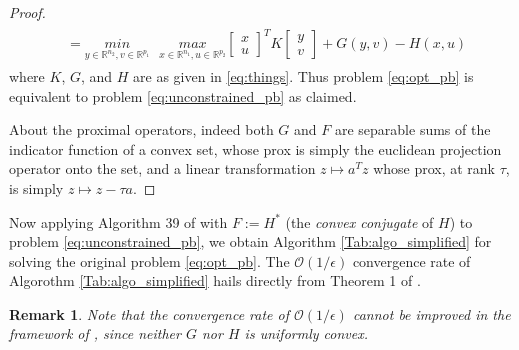\documentclass{article} %
\newtheorem{remark}{Remark}
\begin{document}
\begin{proof}
\begin{eqnarray*}
\begin{split}
      &=     \underset{y \in \mathbb{R}^{n_2}, v\in \mathbb{R}^{p_1}}{min}\text{ }\underset{x \in \mathbb{R}^{n_1}, u \in \mathbb{R}^{p_2}}{max}
           {\begin{bmatrix}x\\u\end{bmatrix}^TK\begin{bmatrix}y\\v\end{bmatrix} + G(y, v) - H(x, u)}
    \end{split}
  \end{eqnarray*}
where $K$, $G$, and $H$ are as given in \eqref{eq:things}. Thus problem \eqref{eq:opt_pb} is equivalent to problem \eqref{eq:unconstrained_pb} as claimed.

About the proximal operators, indeed both $G$ and $F$ are separable sums of the indicator function of a convex set, whose prox is simply the euclidean projection operator onto the set,  and a linear transformation $z \mapsto a^Tz$ whose prox, at rank $\tau$, is simply $z \mapsto z - \tau a$.
\end{proof}
Now applying Algorithm 39 of \cite{chambolle2010} with $F := H^*$ (the \textit{convex conjugate} of $H$)
 to problem \eqref{eq:unconstrained_pb}, we obtain Algorithm \ref{Tab:algo_simplified} for solving the original problem \eqref{eq:opt_pb}. The $\mathcal{O}(1/\epsilon)$ convergence rate of Algorothm \ref{Tab:algo_simplified} hails directly from Theorem 1 of \cite{chambolle2010}.
\begin{remark}
  Note that the convergence rate of $\mathcal{O}(1/\epsilon)$ cannot be improved in the framework of \cite{chambolle2010}, since neither $G$ nor $H$ is \textit{uniformly convex}.
\end{remark}

\end{document}
